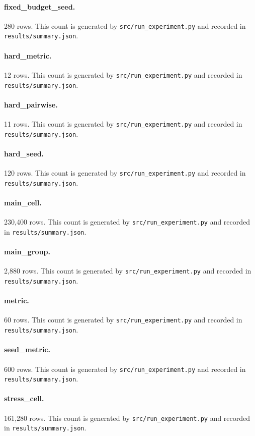 \documentclass{article}
\begin{document}
\paragraph{fixed\_budget\_seed.} 280 rows. This count is generated by \texttt{src/run\_experiment.py} and recorded in \texttt{results/summary.json}.
\paragraph{hard\_metric.} 12 rows. This count is generated by \texttt{src/run\_experiment.py} and recorded in \texttt{results/summary.json}.
\paragraph{hard\_pairwise.} 11 rows. This count is generated by \texttt{src/run\_experiment.py} and recorded in \texttt{results/summary.json}.
\paragraph{hard\_seed.} 120 rows. This count is generated by \texttt{src/run\_experiment.py} and recorded in \texttt{results/summary.json}.
\paragraph{main\_cell.} 230,400 rows. This count is generated by \texttt{src/run\_experiment.py} and recorded in \texttt{results/summary.json}.
\paragraph{main\_group.} 2,880 rows. This count is generated by \texttt{src/run\_experiment.py} and recorded in \texttt{results/summary.json}.
\paragraph{metric.} 60 rows. This count is generated by \texttt{src/run\_experiment.py} and recorded in \texttt{results/summary.json}.
\paragraph{seed\_metric.} 600 rows. This count is generated by \texttt{src/run\_experiment.py} and recorded in \texttt{results/summary.json}.
\paragraph{stress\_cell.} 161,280 rows. This count is generated by \texttt{src/run\_experiment.py} and recorded in \texttt{results/summary.json}.
\end{document}
